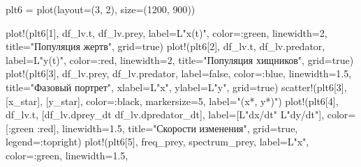 \documentclass[
  12pt,
  a4paper,
  DIV=11,
  numbers=noendperiod]{scrreprt}
\newenvironment{Shaded}{\begin{snugshade}}{\end{snugshade}}
\newcommand{\ConstantTok}[1]{\textcolor[rgb]{0.56,0.35,0.01}{#1}}
\newcommand{\FloatTok}[1]{\textcolor[rgb]{0.68,0.00,0.00}{#1}}
\newcommand{\FunctionTok}[1]{\textcolor[rgb]{0.28,0.35,0.67}{#1}}
\newcommand{\NormalTok}[1]{\textcolor[rgb]{0.00,0.23,0.31}{#1}}
\newcommand{\OperatorTok}[1]{\textcolor[rgb]{0.37,0.37,0.37}{#1}}
\newcommand{\StringTok}[1]{\textcolor[rgb]{0.13,0.47,0.30}{#1}}
\begin{document}
\begin{Shaded}
\begin{Highlighting}[]
\NormalTok{plt6 }\OperatorTok{=} \FunctionTok{plot}\NormalTok{(layout}\OperatorTok{=}\NormalTok{(}\FloatTok{3}\NormalTok{, }\FloatTok{2}\NormalTok{), size}\OperatorTok{=}\NormalTok{(}\FloatTok{1200}\NormalTok{, }\FloatTok{900}\NormalTok{))}

\FunctionTok{plot!}\NormalTok{(plt6[}\FloatTok{1}\NormalTok{], df\_lv.t, df\_lv.prey, label}\OperatorTok{=}\NormalTok{L}\StringTok{"x(t)"}\NormalTok{, color}\OperatorTok{=:}\NormalTok{green, linewidth}\OperatorTok{=}\FloatTok{2}\NormalTok{,}
\NormalTok{    title}\OperatorTok{=}\StringTok{"Популяция жертв"}\NormalTok{, grid}\OperatorTok{=}\ConstantTok{true}\NormalTok{)}
\FunctionTok{plot!}\NormalTok{(plt6[}\FloatTok{2}\NormalTok{], df\_lv.t, df\_lv.predator, label}\OperatorTok{=}\NormalTok{L}\StringTok{"y(t)"}\NormalTok{, color}\OperatorTok{=:}\NormalTok{red, linewidth}\OperatorTok{=}\FloatTok{2}\NormalTok{,}
\NormalTok{    title}\OperatorTok{=}\StringTok{"Популяция хищников"}\NormalTok{, grid}\OperatorTok{=}\ConstantTok{true}\NormalTok{)}
\FunctionTok{plot!}\NormalTok{(plt6[}\FloatTok{3}\NormalTok{], df\_lv.prey, df\_lv.predator, label}\OperatorTok{=}\ConstantTok{false}\NormalTok{, color}\OperatorTok{=:}\NormalTok{blue, linewidth}\OperatorTok{=}\FloatTok{1.5}\NormalTok{,}
\NormalTok{    title}\OperatorTok{=}\StringTok{"Фазовый портрет"}\NormalTok{, xlabel}\OperatorTok{=}\NormalTok{L}\StringTok{"x"}\NormalTok{, ylabel}\OperatorTok{=}\NormalTok{L}\StringTok{"y"}\NormalTok{, grid}\OperatorTok{=}\ConstantTok{true}\NormalTok{)}
\FunctionTok{scatter!}\NormalTok{(plt6[}\FloatTok{3}\NormalTok{], [x\_star], [y\_star], color}\OperatorTok{=:}\NormalTok{black, markersize}\OperatorTok{=}\FloatTok{5}\NormalTok{, label}\OperatorTok{=}\StringTok{"(x*, y*)"}\NormalTok{)}
\FunctionTok{plot!}\NormalTok{(plt6[}\FloatTok{4}\NormalTok{], df\_lv.t, [df\_lv.dprey\_dt df\_lv.dpredator\_dt],}
\NormalTok{    label}\OperatorTok{=}\NormalTok{[L}\StringTok{"dx/dt"}\NormalTok{ L}\StringTok{"dy/dt"}\NormalTok{], color}\OperatorTok{=}\NormalTok{[}\OperatorTok{:}\NormalTok{green }\OperatorTok{:}\NormalTok{red], linewidth}\OperatorTok{=}\FloatTok{1.5}\NormalTok{,}
\NormalTok{    title}\OperatorTok{=}\StringTok{"Скорости изменения"}\NormalTok{, grid}\OperatorTok{=}\ConstantTok{true}\NormalTok{, legend}\OperatorTok{=:}\NormalTok{topright)}
\FunctionTok{plot!}\NormalTok{(plt6[}\FloatTok{5}\NormalTok{], freq\_prey, spectrum\_prey, label}\OperatorTok{=}\NormalTok{L}\StringTok{"x"}\NormalTok{, color}\OperatorTok{=:}\NormalTok{green, linewidth}\OperatorTok{=}\FloatTok{1.5}\NormalTok{,}

\end{Highlighting}
\end{Shaded}
\end{document}
